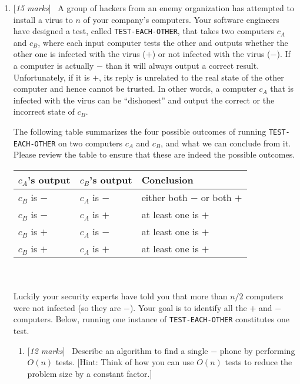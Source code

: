 \documentclass[11pt]{article}
\newcommand{\Q}[1]{\medskip\item {[{\em #1 marks\/}]}\ }
\begin{document}
\begin{enumerate}


\Q{15}
A group of hackers from an enemy organization has attempted to install a virus to $n$ of your company's computers. Your software engineers have designed a test, called \texttt{TEST-EACH-OTHER}, that takes two computers $c_A$ and $c_B$, where each input computer tests the other and outputs whether the other one is infected with the virus ($+$)  or not infected with the virus ($-$).     
If a computer is actually $-$ than it will always output a correct result. Unfortunately,
if it is $+$, its reply is unrelated to the real state of the other computer and hence cannot be trusted. In other words, a computer $c_A$ that is infected with the virus can be ``dishonest'' and output the correct or the incorrect state of $c_B$. 

The following table summarizes the four possible outcomes of running \texttt{TEST-EACH-OTHER} on two computers $c_A$ and $c_B$, and what we can conclude from it. Please review the table to ensure that these are indeed the possible outcomes.


\begin{tabular}{ p{3cm} | p{3cm} | p{5cm}  }
{\bf $c_A$'s output} & {\bf $c_B$'s output} &{\bf Conclusion}  \\
\hline
\cline{1-3}\cline{1-3}\cline{1-3}\cline{1-3}\cline{1-3}\cline{1-3}
$c_B$ is $-$ & $c_A$ is $-$ &  either both $-$ or both $+$ \\
\cline{1-3}\cline{1-3}\cline{1-3}\cline{1-3}\cline{1-3}\cline{1-3}
$c_B$ is $-$ & $c_A$ is $+$ & at least one is $+$ \\
\cline{1-3}\cline{1-3}\cline{1-3}\cline{1-3}\cline{1-3}\cline{1-3}
$c_B$ is $+$ & $c_A$ is $-$ & at least one is $+$ \\
\cline{1-3}\cline{1-3}\cline{1-3}\cline{1-3}\cline{1-3}\cline{1-3}
$c_B$ is $+$ & $c_A$ is $+$  & at least one is $+$ \\
\cline{1-3}
\end{tabular}

\leavevmode 
\\\\
 Luckily your security experts have told you that more than $n/2$ computers were not infected (so they are $-$). Your goal is to identify all the $+$ and $-$ computers. Below, running one instance of \texttt{TEST-EACH-OTHER} constitutes one test.

 \begin{enumerate}
  \Q{12} Describe an algorithm to find a single $-$ phone by performing $O(n)$ tests. [Hint: Think of how you can use $O(n)$ tests to reduce the problem size by a constant factor.]
  

\end{enumerate}
\end{enumerate}
\end{document}
